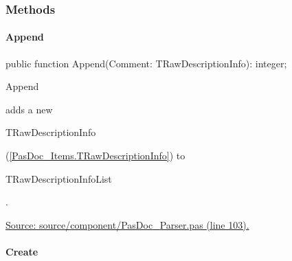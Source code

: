 \documentclass{report}
\newif\ifpdf
\begin{document}
\subsubsection*{\large{\textbf{Methods}}\normalsize\hspace{1ex}\hfill}
\paragraph*{Append}\hspace*{\fill}

\label{PasDoc_Parser.TRawDescriptionInfoList-Append}
\begin{list}{}{
\setlength{\itemindent}{0cm}
\setlength{\listparindent}{0cm}
\setlength{\leftmargin}{\evensidemargin}
\addtolength{\leftmargin}{\tmplength}
\settowidth{\labelsep}{X}
\addtolength{\leftmargin}{\labelsep}
\setlength{\labelwidth}{\tmplength}
}
\item[\textbf{Declaration}\hfill]
\ifpdf
\begin{flushleft}
\fi
\begin{ttfamily}
public function Append(Comment: TRawDescriptionInfo): integer;\end{ttfamily}

\ifpdf
\end{flushleft}
\fi

\par
\item[\textbf{Description}]
\begin{ttfamily}Append\end{ttfamily} adds a new \begin{ttfamily}TRawDescriptionInfo\end{ttfamily}(\ref{PasDoc_Items.TRawDescriptionInfo}) to \begin{ttfamily}TRawDescriptionInfoList\end{ttfamily}.\par
\href{https://github.com/pasdoc/pasdoc/blob/master/source/component/PasDoc_Parser.pas#L103}{Source: source/component/PasDoc{\_}Parser.pas (line 103).}

\end{list}
\paragraph*{Create}\hspace*{\fill}
\end{document}
